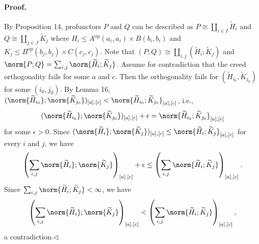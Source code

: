 \paragraph{Proof.} By Proposition 14, profunctors $P$ and $Q$ can be described as $P\cong\coprod_{i\in I}\widetilde H_i$ and $Q\cong\coprod_{j\in J}\widetilde K_j$ where $H_i\le A^{\mathrm{op}}(a_i,a_i)\times B(b_i,b_i)$ and $K_j\le B^{\mathrm{op}}(b_j,b_j)\times C(c_j,c_j)$. Note that $(P;Q)\cong\coprod_{i,j}(\widetilde H_i;\widetilde K_j)$ and $\norm{P;Q}=\sum_{i,j}\norm{\widetilde H_i;\widetilde K_j}$.
Assume for contradiction that the creed orthogonality fails for some $a$ and $c$. Then the orthogonality fails for $(\widetilde H_{i_0},\widetilde K_{j_0})$ for some $(i_0,j_0)$. By Lemma 16,
$(\norm{\widetilde H_{i_0}};\norm{\widetilde K_{j_0}})_{[a],[c]}<
\norm{\widetilde H_{i_0};\widetilde K_{j_0}}_{[a],[c]}$,
i.e.,
\[
(\norm{\widetilde H_{i_0}};\norm{\widetilde K_{j_0}})_{[a],[c]}+\epsilon
=\norm{\widetilde H_{i_0};\widetilde K_{j_0}}_{[a],[c]}
\]
for some $\epsilon>0$. Since $(\norm{\widetilde H_i};\norm{\widetilde K_j})_{[a],[c]}\le\norm{\widetilde H_i;\widetilde K_j}_{[a],[c]}$ for every $i$ and $j$, we have
\[
\left(\sum_{i,j}\norm{\widetilde H_i};\norm{\widetilde K_j}\right)_{[a],[c]}+\epsilon
\le\left(\sum_{i,j}\norm{\widetilde H_i;\widetilde K_j}\right)_{[a],[c]}.
\]
Since $\sum_{i,j}\norm{\widetilde H_i;\widetilde K_j}<\infty$, we have
\[
\left(\sum_{i,j}\norm{\widetilde H_i};\norm{\widetilde K_j}\right)_{[a],[c]}
<\left(\sum_{i,j}\norm{\widetilde H_i;\widetilde K_j}\right)_{[a],[c]},
\]
a contradiction.\hfill$\triangleleft$
